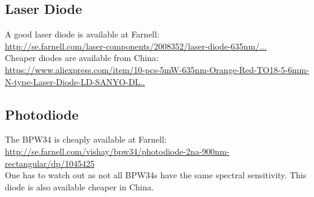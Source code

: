 \documentclass{article}
\begin{document}
\subsection{Laser Diode}
A good laser diode is available at Farnell:\\
\href{http://se.farnell.com/laser-components/2008352/laser-diode-635nm/dp/1272657?ost=laser+635+nm&categoryId=700000006112&searchView=table&iscrfnonsku=false}{http://se.farnell.com/laser-components/2008352/laser-diode-635nm/...}\\
Cheaper diodes are available from China:\\
\href{https://www.aliexpress.com/item/10-pcs-5mW-635nm-Orange-Red-TO18-5-6mm-N-type-Laser-Diode-LD-SANYO-DL/32622824538.html?spm=2114.01010208.3.322.KNKdbx&ws_ab_test=searchweb0_0,searchweb201602_3_10065_10068_10136_10137_10138_10060_10062_10141_10056_10055_10054_122_10059_10099_10103_10102_10096_10052_10053_10050_10107_10142_10051_10143_10084_10083_10080_10082_10081_10110_10111_10112_10113_10114_10078_10079_10073_10070_10123_10124,searchweb201603_2,afswitch_1,ppcSwitch_4,single_sort_0_default&btsid=b98573dc-6228-4b35-ad77-02e75b3fe435&algo_expid=3174f530-2df6-46b1-87c5-c36e2f9f58b0-38&algo_pvid=3174f530-2df6-46b1-87c5-c36e2f9f58b0}{https://www.aliexpress.com/item/10-pcs-5mW-635nm-Orange-Red-TO18-5-6mm-N-type-Laser-Diode-LD-SANYO-DL..}
\subsection{Photodiode}
The BPW34 is cheaply available at Farnell:\\
\href{http://se.farnell.com/vishay/bpw34/photodiode-2na-900nm-rectangular/dp/1045425}{http://se.farnell.com/vishay/bpw34/photodiode-2na-900nm-rectangular/dp/1045425}\\
One has to watch out as not all BPW34s have the same spectral sensitivity. This diode is also available cheaper in China.  
\end{document}
